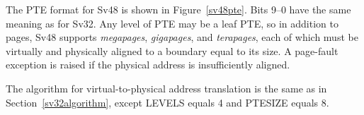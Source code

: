 The PTE format for Sv48 is shown in Figure~\ref{sv48pte}.  Bits 9--0
have the same meaning as for Sv32.  Any level of PTE may be a leaf
PTE, so in addition to  pages, Sv48 supports
 {\em megapages},  {\em gigapages}, and
 {\em terapages}, each of which must be virtually and
physically aligned to a boundary equal to its size.
A page-fault exception is raised if the physical address is insufficiently
aligned.

The algorithm for virtual-to-physical address translation is the same
as in Section~\ref{sv32algorithm}, except LEVELS equals 4 and PTESIZE
equals 8.
